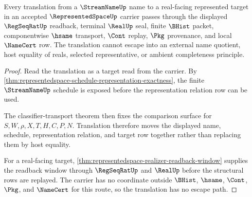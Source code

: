 \begin{theorem}
\label{thm:representedspace-translation-nonescape}
Every translation from a $\StreamNameUp$ name to a real-facing represented target in an accepted $\RepresentedSpaceUp$ carrier passes through the displayed $\RegSeqRatUp$ readback, terminal $\RealUp$ seal, finite $\BHist$ packet, componentwise $\hsame$ transport, $\Cont$ replay, $\Pkg$ provenance, and local $\NameCert$ row. The translation cannot escape into an external name quotient, host equality of reals, selected representative, or ambient completeness principle.
\end{theorem}
\begin{proof}
Read the translation as a target read from the carrier. By \autoref{thm:representedspace-schedule-representation-exactness}, the finite $\StreamNameUp$ schedule is exposed before the representation relation row can be used.

The classifier-transport theorem then fixes the comparison surface for $S,W,\rho,X,T,H,C,P,N$. Translation therefore moves the displayed name, schedule, representation relation, and target row together rather than replacing them by host equality.

For a real-facing target, \autoref{thm:representedspace-realizer-readback-window} supplies the readback window through $\RegSeqRatUp$ and $\RealUp$ before the structural rows are replayed. The carrier has no coordinate outside $\BHist$, $\hsame$, $\Cont$, $\Pkg$, and $\NameCert$ for this route, so the translation has no escape path.
\end{proof}

